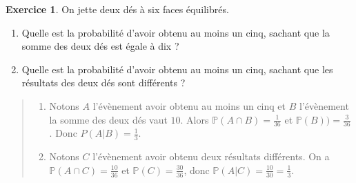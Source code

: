 \documentclass[11pt]{article}
\renewcommand{\P}{\mathbb P}
\theoremstyle{definition}
\newtheorem{exo}{Exercice}
\newenvironment{solution}{\begin{quote}\color{teal}}{\end{quote}}
\begin{document}
\begin{exo}
On jette deux dés à six faces équilibrés.
\begin{enumerate}
\item Quelle est la probabilité d'avoir obtenu au moins un cinq, sachant que la somme des deux dés est égale à dix ?
\item Quelle est la probabilité d'avoir obtenu au moins un cinq, sachant que les résultats des deux dés sont différents ?
\end{enumerate}
\begin{solution}
\begin{enumerate}
\item Notons $A$ l'évènement \og avoir obtenu au moins un cinq\fg{} et $B$ l'évènement \og la somme des deux dés vaut $10$\fg. Alors $\P(A\cap B) = \frac{1}{36}$ et $\P(B)) = \frac{3}{36}$. Donc $P(A|B) = \frac{1}{3}$.
\item Notons $C$ l'évènement \og avoir obtenu deux résultats différents\fg. On a $\P(A\cap C)=\frac{10}{36}$  et $\P(C) = \frac{30}{36}$, donc $\P(A|C)=\frac{10}{30} = \frac{1}{3}$.
\end{enumerate}
\end{solution}
\end{exo}
\end{document}
